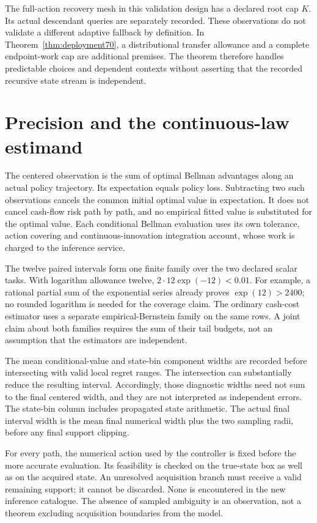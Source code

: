 The full-action recovery mesh in this validation design has a declared root cap $K$. Its actual descendant queries are separately recorded. These observations do not validate a different adaptive fallback by definition. In Theorem~\ref{thm:deployment70}, a distributional transfer allowance and a complete endpoint-work cap are additional premises. The theorem therefore handles predictable choices and dependent contexts without asserting that the recorded recursive state stream is independent.

\section{Precision and the continuous-law estimand}\label{supp:precision70}

The centered observation is the sum of optimal Bellman advantages along an actual policy trajectory. Its expectation equals policy loss. Subtracting two such observations cancels the common initial optimal value in expectation. It does not cancel cash-flow risk path by path, and no empirical fitted value is substituted for the optimal value. Each conditional Bellman evaluation uses its own tolerance, action covering and continuous-innovation integration account, whose work is charged to the inference service.

The twelve paired intervals form one finite family over the two declared scalar tasks. With logarithm allowance twelve, $2\cdot12\exp(-12)<0.01$. For example, a rational partial sum of the exponential series already proves $\exp(12)>2400$; no rounded logarithm is needed for the coverage claim. The ordinary cash-cost estimator uses a separate empirical-Bernstein family on the same rows. A joint claim about both families requires the sum of their tail budgets, not an assumption that the estimators are independent.

The mean conditional-value and state-bin component widths are recorded before intersecting with valid local regret ranges. The intersection can substantially reduce the resulting interval. Accordingly, those diagnostic widths need not sum to the final centered width, and they are not interpreted as independent errors. The state-bin column includes propagated state arithmetic. The actual final interval width is the mean final numerical width plus the two sampling radii, before any final support clipping.

For every path, the numerical action used by the controller is fixed before the more accurate evaluation. Its feasibility is checked on the true-state box as well as on the acquired state. An unresolved acquisition branch must receive a valid remaining support; it cannot be discarded. None is encountered in the new inference catalogue. The absence of sampled ambiguity is an observation, not a theorem excluding acquisition boundaries from the model.

